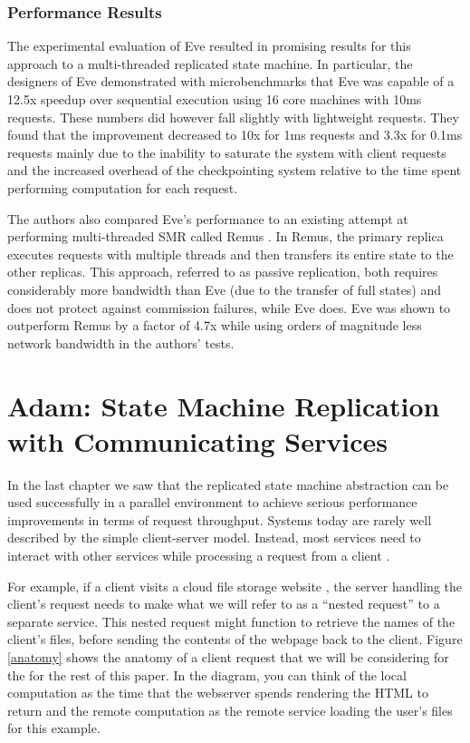 \documentclass[11pt, oneside]{report}
\begin{document}
\subsection{Performance Results}\label{EveResults}

The experimental evaluation of Eve resulted in promising results for this approach to a multi-threaded replicated state machine. 
In particular, the designers of Eve demonstrated with microbenchmarks that Eve was capable of a 12.5x speedup over sequential execution using 16 core machines with 10ms requests. 
These numbers did however fall slightly with lightweight requests. 
They found that the improvement decreased to 10x for 1ms requests and 3.3x for 0.1ms requests mainly due to the inability to saturate the system with client requests and the increased overhead of the checkpointing system relative to the time spent performing computation for each request.

The authors also compared Eve's performance to an existing attempt at performing multi-threaded SMR called Remus \cite{remus}. 
In Remus, the primary replica executes requests with multiple threads and then transfers its entire state to the other replicas. 
This approach, referred to as passive replication, both requires considerably more bandwidth than Eve (due to the transfer of full states) and does not protect against commission failures, while Eve does. 
Eve was shown to outperform Remus by a factor of 4.7x while using orders of magnitude less network bandwidth in the authors' tests.

\chapter{Adam: State Machine Replication with Communicating Services}\label{Adam}

In the last chapter we saw that the replicated state machine abstraction can be used successfully in a parallel environment to achieve serious performance improvements in terms of request throughput. 
Systems today are rarely well described by the simple client-server model.
Instead, most services need to interact with other services while processing a request from a client \cite{tao, spanner, dynamo}. 

For example, if a client visits a cloud file storage website \cite{dropbox}, the server handling the client's request needs to make what we will refer to as a ``nested request'' to a separate service. This nested request might function to retrieve the names of the client's files, before sending the contents of the webpage back to the client. Figure \ref{anatomy} shows the anatomy of a client request that we will be considering for the for the rest of this paper. In the diagram, you can think of the local computation as the time that the webserver spends rendering the HTML to return and the remote computation as the remote service loading the user's files for this example.
\end{document}

